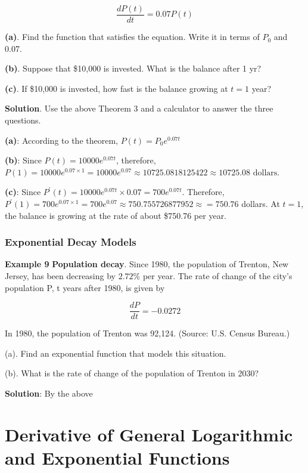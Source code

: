 \documentclass[
]{book}
\begin{document}
\[
\frac{dP(t)}{dt}=0.07P(t)
\]

\textbf{(a)}. Find the function that satisfies the equation. Write it in terms of \(P_0\) and 0.07.

\textbf{(b)}. Suppose that \$10,000 is invested. What is the balance after 1 yr?

\textbf{(c)}. If \$10,000 is invested, how fast is the balance growing at \(t=1\) year?

\textbf{Solution}. Use the above Theorem 3 and a calculator to answer the three questions.

\textbf{(a)}: According to the theorem, \(P(t) = P_0 e^{0.07t}\)

\textbf{(b)}: Since \(P(t) = 10000e^{0.07t}\), therefore, \(P(1) = 10000e^{0.07\times 1} = 10000e^{0.07} \approx 10725.0818125422 \approx 10725.08 \text{ dollars}\).

\textbf{(c)}: Since \(P^\prime(t) = 10000e^{0.07t}\times 0.07 = 700e^{0.07t}\). Therefore, \(P^\prime(1) = 700e^{0.07\times 1} = 700e^{0.07} \approx 750.755726877952 \approx =750.76\) dollars. At \(t = 1\), the balance is growing at the rate of about \$750.76 per year.

\hfill\break

\hypertarget{exponential-decay-models}{%
\subsection{Exponential Decay Models}\label{exponential-decay-models}}

\textbf{Example 9} \textbf{Population decay}. Since 1980, the population of Trenton, New Jersey, has been decreasing by \(2.72\%\) per year. The rate of change of the city's population P, t years after 1980, is given by

\[
\frac{dP}{dt} = -0.0272
\]

In 1980, the population of Trenton was 92,124. (Source: U.S. Census Bureau.)

(a). Find an exponential function that models this situation.

(b). What is the rate of change of the population of Trenton in 2030?

\textbf{Solution}: By the above

\hypertarget{derivative-of-general-logarithmic-and-exponential-functions}{%
\chapter{Derivative of General Logarithmic and Exponential Functions}\label{derivative-of-general-logarithmic-and-exponential-functions}}
\end{document}
